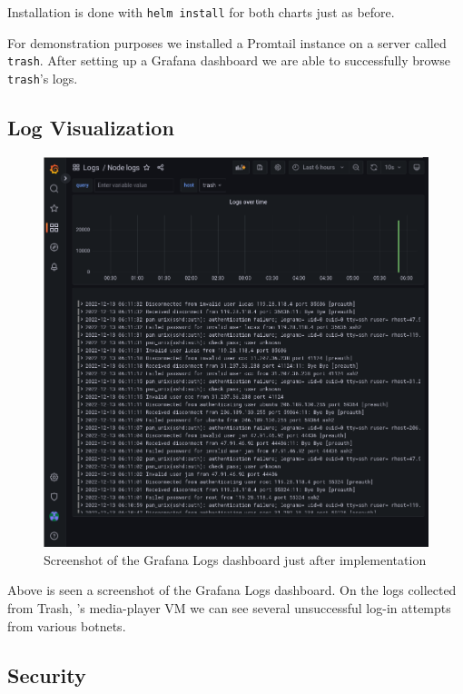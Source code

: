 Installation is done with \verb+helm install+ for both charts just as before.

For demonstration purposes we installed a Promtail instance on a server called
\verb+trash+. After setting up a Grafana dashboard we are able to successfully
browse \verb+trash+'s logs.

\newpage

\subsection{Log Visualization}

\begin{figure}[!h]
	\centering
	\includegraphics[width=150mm, keepaspectratio]{figures/grafana-logs-trash.png}
	\caption{Screenshot of the Grafana Logs dashboard just after implementation}
\end{figure}

Above is seen a screenshot of the Grafana Logs dashboard. On the logs collected
from Trash, \kszk's media-player VM we can see several unsuccessful log-in
attempts from various botnets.

\subsection{Security}

